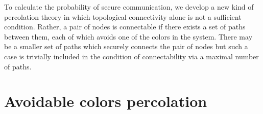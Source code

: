 \documentclass[aps, pre, twocolumn, a4paper, superscriptaddress, floatfix]{revtex4}
\begin{document}

To calculate the probability of secure communication, we develop a new kind of percolation theory in which topological connectivity alone is not a sufficient condition.
Rather, a pair of nodes is connectable if there exists a set of paths between them, each of which avoids one of the colors in the system.
There may be a smaller set of paths which securely connects the pair of nodes but such a case is trivially included in the condition of connectability via a maximal number of paths.

%
%
%
%



\section{Avoidable colors percolation}
\end{document}
